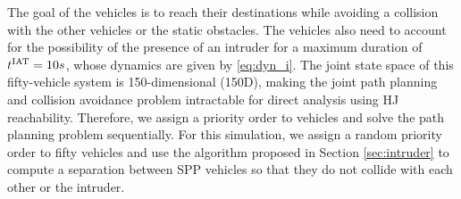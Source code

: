 The goal of the vehicles is to reach their destinations while avoiding a collision with the other vehicles or the static obstacles. The vehicles also need to account for the possibility of the presence of an intruder for a maximum duration of $t^\text{IAT} = 10s$, whose dynamics are given by \eqref{eq:dyn_i}. The joint state space of this fifty-vehicle system is 150-dimensional (150D), making the joint path planning and collision avoidance problem intractable for direct analysis using HJ reachability. Therefore, we assign a priority order to vehicles and solve the path planning problem sequentially. For this simulation, we assign a random priority order to fifty vehicles and use the algorithm proposed in Section \ref{sec:intruder} to compute a separation between SPP vehicles so that they do not collide with each other or the intruder. 

